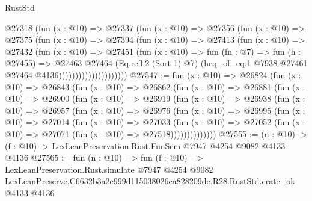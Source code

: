 \begin{lexlean}{RustStd}
\begin{coremodule}
                          @27318
                            (fun (x : @10) =>
                            @27337
                              (fun (x : @10) =>
                              @27356
                                (fun (x : @10) =>
                                @27375
                                  (fun (x : @10) =>
                                  @27394
                                    (fun (x : @10) =>
                                    @27413
                                      (fun (x : @10) =>
                                      @27432
                                        (fun (x : @10) =>
                                        @27451
                                          (fun (x : @10) =>
                                          fun (fn : @7) =>
                                          fun (h : @27455) =>
                                          @27463
                                            @27464
                                            (Eq.refl.{2} (Sort 1) @7)
                                            (heq_of_eq.{1}
                                              @7938
                                              @27461
                                              @27464
                                              @4136)))))))))))))))))))))
@27547 := fun (x : @10) =>
  @26824
    (fun (x : @10) =>
    @26843
      (fun (x : @10) =>
      @26862
        (fun (x : @10) =>
        @26881
          (fun (x : @10) =>
          @26900
            (fun (x : @10) =>
            @26919
              (fun (x : @10) =>
              @26938
                (fun (x : @10) =>
                @26957
                  (fun (x : @10) =>
                  @26976
                    (fun (x : @10) =>
                    @26995
                      (fun (x : @10) =>
                      @27014
                        (fun (x : @10) =>
                        @27033
                          (fun (x : @10) =>
                          @27052 (fun (x : @10) => @27071 (fun (x : @10) => @27518))))))))))))))
@27555 := (n : @10) -> (f : @10) -> LexLeanPreservation.Rust.FunSem @7947 @4254 @9082 @4133 @4136
@27565 := fun (n : @10) =>
  fun (f : @10) =>
  LexLeanPreservation.Rust.simulate
    @7947
    @4254
    @9082
    LexLeanPreserve.C6632b3a2e999d115038026ca828209de.R28.RustStd.crate_ok
    @4133
    @4136
\end{coremodule}
\end{lexlean}
